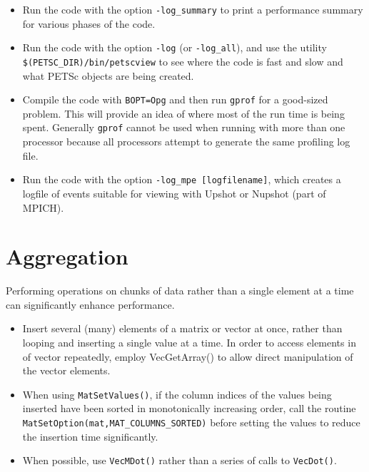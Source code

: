 \begin{itemize}
\item Run the code with the option {\tt -log\_summary} to print a performance
   summary for various phases of the code. 

\item Run the code with the option {\tt -log} (or {\tt -log\_all}), and use the utility
   {\tt \$(PETSC\_DIR)/bin/petscview} to see where the code is fast and slow and
   what PETSc objects are being created.  

\item Compile the code with {\tt BOPT=Opg} and then run {\tt gprof} for a good-sized 
   problem.  This will provide an idea of where most of the run time is being spent. 
   Generally {\tt gprof} cannot be used when running with more than one processor because
   all processors attempt to generate the same profiling log file.

\item Run the code with the option {\tt -log\_mpe [logfilename]}, which creates a
   logfile of events suitable for viewing with Upshot or Nupshot (part of
   MPICH). 

\end{itemize}

\section{Aggregation}

Performing operations on chunks of data rather than a single element
at a time can significantly enhance performance.  
\begin{itemize}
\item Insert several (many) elements of a matrix or vector at once, rather 
   than looping and inserting a single value at a time.  In order to
   access elements in of vector repeatedly, employ {VecGetArray()} to allow 
   direct manipulation of the vector elements. 

\item When using {\tt MatSetValues()}, if the column indices of the values being
   inserted have been sorted in monotonically increasing order, call
   the routine {\tt MatSetOption(mat,MAT\_COLUMNS\_SORTED)} before setting the values
   to reduce the insertion time significantly.

\item When possible, use {\tt VecMDot()} rather than a series of calls to {\tt VecDot()}.
\end{itemize}

